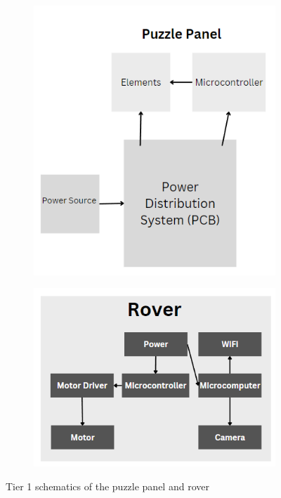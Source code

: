 \documentclass[a4paper, 10pt]{article}
\begin{document}
		\begin{figure}[h]
			\centering
			\begin{subfigure}[h]{0.44\textwidth}
				\centering
				\includegraphics[width=\textwidth]{Photos/Puzzle Panel tier 1 schematic}
			\end{subfigure}
			\hfill
			\begin{subfigure}[h]{0.55\textwidth}
				\centering
				\includegraphics[width=\textwidth]{Photos/Rover tier 1 schematic}
			\end{subfigure}
			\centering
			\caption{Tier 1 schematics of the puzzle panel and rover}
			\label{tier_1_schems}
		\end{figure}
 
\end{document}
